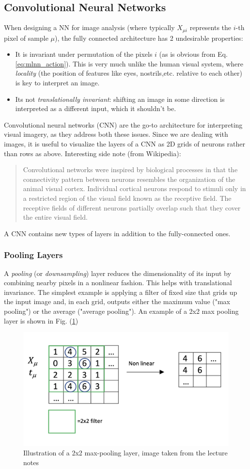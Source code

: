 \documentclass{article}
\begin{document}
\subsection{Convolutional Neural Networks}
When designing a NN for image analysis (where typically $X_{\mu i}$ represents the $i$-th pixel of sample $\mu$), the fully connected architecture has 2 undesirable properties:
\begin{itemize}
    \item It is invariant under permutation of the pixels $i$ (as is obvious from Eq. \ref{eq:mlnn_action}). This is very much unlike the human visual system, where \emph{locality} (the position of features like eyes, nostrils,etc. relative to each other) is key to interpret an image.
    \item Its not \emph{translationally invariant}: shifting an image in some direction is interpreted as a different input, which it shouldn't be.
\end{itemize}
Convolutional neural networks (CNN) are the go-to architecture for interpreting visual imagery, as they address both these issues. Since we are dealing with images, it is useful to visualize the layers of a CNN as 2D grids of neurons rather than rows as above. Interesting side note (from Wikipedia):
\begin{quotation}
    Convolutional networks were inspired by biological processes in that the connectivity pattern between neurons resembles the organization of the animal visual cortex. Individual cortical neurons respond to stimuli only in a restricted region of the visual field known as the receptive field. The receptive fields of different neurons partially overlap such that they cover the entire visual field.
\end{quotation}
A CNN contains new types of layers in addition to the fully-connected ones.
\subsubsection*{Pooling Layers}
A \emph{pooling} (or \emph{downsampling}) layer reduces the dimensionality of its input by combining nearby pixels in a nonlinear fashion. This helps with translational invariance. The simplest example is applying a filter of fixed size that grids up the input image and, in each grid, outputs either the maximum value ("max pooling") or the average ("average pooling"). An example of a 2x2 max pooling layer is shown in Fig. (\ref{fig:pooling})
\begin{figure}[h]
    \centering
    \includegraphics[width=0.47\linewidth]{downsampling}
    \caption{Illustration of a 2x2 max-pooling layer, image taken from the lecture notes}
    \label{fig:pooling}
\end{figure}
\end{document}
